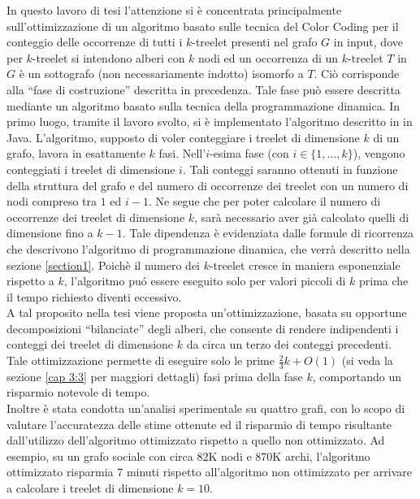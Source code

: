 In questo lavoro di tesi l'attenzione si è concentrata principalmente sull'ottimizzazione di un algoritmo basato sulle tecnica del Color Coding per il conteggio delle occorrenze di tutti i $k$-treelet presenti nel grafo $G$ in input, dove per $k$-treelet  si intendono alberi con $ k $ nodi ed un occorrenza di un $k$-treelet $T$ in $G$ è un sottografo (non necessariamente indotto) isomorfo a $T$.
Ci\`o corrisponde alla ``fase di costruzione'' descritta in precedenza. Tale fase pu\`o essere descritta mediante un algoritmo basato sulla tecnica della programmazione dinamica.
In primo luogo, tramite il lavoro svolto, si \`e implementato l'algoritmo descritto in  \cite{bressan2018motif} in Java.
L'algoritmo, supposto di voler conteggiare i treelet di dimensione $ k $ di un grafo, lavora in esattamente  $k$ fasi.
Nell'$i$-esima fase (con $i \in \{1, \dots, k\}$), vengono conteggiati i treelet di dimensione $i$.
Tali conteggi saranno ottenuti in funzione della struttura del grafo e del numero di occorrenze dei treelet con un numero di nodi compreso tra $1$ ed $i-1$.
Ne segue che per poter calcolare il numero di occorrenze dei treelet di dimensione $ k $, sar\`a necessario aver gi\`a calcolato quelli di dimensione fino a $ k-1$.
Tale dipendenza \`e evidenziata dalle formule di ricorrenza che descrivono l'algoritmo di programmazione dinamica, che verr\`a descritto nella sezione \ref{section1}.
Poich\`e il numero dei $ k $-treelet cresce in maniera esponenziale rispetto a $ k $, l'algoritmo pu\'o essere eseguito solo per valori piccoli di $ k $ prima che il tempo richiesto diventi eccessivo.\\
A tal proposito nella tesi viene proposta un'ottimizzazione, basata su opportune decomposizioni ``bilanciate'' degli alberi, che consente di rendere indipendenti i conteggi dei treelet di dimensione $ k $ da circa un terzo dei conteggi precedenti.
Tale ottimizzazione permette di eseguire solo le prime $\frac{2}{3} k + O(1)$ (si veda la sezione \ref{cap 3:3} per maggiori dettagli) fasi prima della fase $ k $, comportando un risparmio notevole di tempo.\\
Inoltre è stata condotta un'analisi sperimentale su quattro grafi, con lo scopo di valutare l'accuratezza delle stime ottenute ed  il risparmio di tempo risultante dall'utilizzo dell'algoritmo ottimizzato rispetto a quello non ottimizzato.
Ad esempio, su un grafo sociale con circa 82K nodi e 870K archi, l'algoritmo  ottimizzato risparmia 7 minuti rispetto all'algoritmo non ottimizzato per arrivare a calcolare i treelet di dimensione $ k=10 $.


